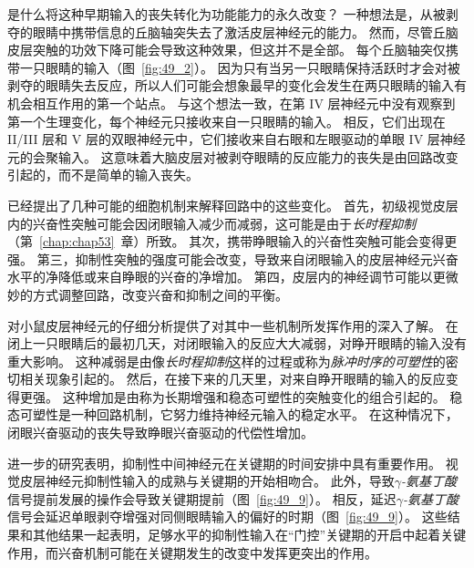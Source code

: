 是什么将这种早期输入的丧失转化为功能能力的永久改变？
一种想法是，从被剥夺的眼睛中携带信息的丘脑轴突失去了激活皮层神经元的能力。
然而，尽管丘脑皮层突触的功效下降可能会导致这种效果，但这并不是全部。
每个丘脑轴突仅携带一只眼睛的输入（图~\ref{fig:49_2}）。
因为只有当另一只眼睛保持活跃时才会对被剥夺的眼睛失去反应，所以人们可能会想象最早的变化会发生在两只眼睛的输入有机会相互作用的第一个站点。
与这个想法一致，在第 IV 层神经元中没有观察到第一个生理变化，每个神经元只接收来自一只眼睛的输入。
相反，它们出现在 II/III 层和 V 层的双眼神经元中，它们接收来自右眼和左眼驱动的单眼 IV 层神经元的会聚输入。
这意味着大脑皮层对被剥夺眼睛的反应能力的丧失是由回路改变引起的，而不是简单的输入丧失。


已经提出了几种可能的细胞机制来解释回路中的这些变化。
首先，初级视觉皮层内的兴奋性突触可能会因闭眼输入减少而减弱，这可能是由于\textit{长时程抑制}（第~\ref{chap:chap53}~章）所致。
其次，携带睁眼输入的兴奋性突触可能会变得更强。
第三，抑制性突触的强度可能会改变，导致来自闭眼输入的皮层神经元兴奋水平的净降低或来自睁眼的兴奋的净增加。
第四，皮层内的神经调节可能以更微妙的方式调整回路，改变兴奋和抑制之间的平衡。


对小鼠皮层神经元的仔细分析提供了对其中一些机制所发挥作用的深入了解。
在闭上一只眼睛后的最初几天，对闭眼输入的反应大大减弱，对睁开眼睛的输入没有重大影响。
这种减弱是由像\textit{长时程抑制}这样的过程或称为\textit{脉冲时序的可塑性}的密切相关现象引起的。
然后，在接下来的几天里，对来自睁开眼睛的输入的反应变得更强。
这种增加是由称为长期增强和稳态可塑性的突触变化的组合引起的。
稳态可塑性是一种回路机制，它努力维持神经元输入的稳定水平。
在这种情况下，闭眼兴奋驱动的丧失导致睁眼兴奋驱动的代偿性增加。


进一步的研究表明，抑制性中间神经元在关键期的时间安排中具有重要作用。
视觉皮层神经元抑制性输入的成熟与关键期的开始相吻合。
此外，导致\textit{$\gamma$-氨基丁酸}信号提前发展的操作会导致关键期提前（图~\ref{fig:49_9}）。
相反，延迟\textit{$\gamma$-氨基丁酸}信号会延迟单眼剥夺增强对同侧眼睛输入的偏好的时期（图~\ref{fig:49_9}）。
这些结果和其他结果一起表明，足够水平的抑制性输入在“门控”关键期的开启中起着关键作用，而兴奋机制可能在关键期发生的改变中发挥更突出的作用。


